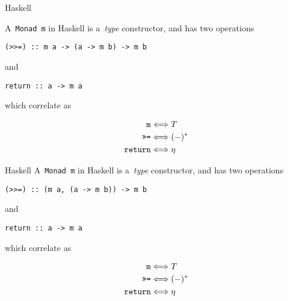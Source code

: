 \documentclass[notes]{beamer}
\begin{document}
\begin{frame}[fragile]{Haskell}

    A~\texttt{Monad m} in Haskell is a~\emph{type} constructor, and
    has two operations
    \begin{verbatim}
(>>=) :: m a -> (a -> m b) -> m b
    \end{verbatim}
    and
    \begin{verbatim}
return :: a -> m a
    \end{verbatim}


    \pause

    which correlate as

    \begin{align*}
        \text{\texttt{m}} &\Longleftrightarrow T \\
        \text{\texttt{>>=}} &\Longleftrightarrow (-)^{\ast} \\
        \text{\texttt{return}} &\Longleftrightarrow \eta
    \end{align*}

\end{frame}

\begin{frame}[fragile]{Haskell}
    A~\texttt{Monad m} in Haskell is a~\emph{type} constructor, and
    has two operations
    \begin{verbatim}
(>>=) :: (m a, (a -> m b)) -> m b
    \end{verbatim}
    and
    \begin{verbatim}
return :: a -> m a
    \end{verbatim}
    which correlate as

    \begin{align*}
        \text{\texttt{m}} &\Longleftrightarrow T \\
        \text{\texttt{>>=}} &\Longleftrightarrow (-)^{\ast} \\
        \text{\texttt{return}} &\Longleftrightarrow \eta
    \end{align*}
\end{frame}
\end{document}

